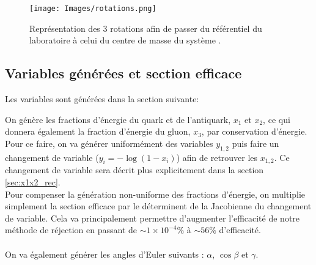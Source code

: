 \documentclass[a4paper]{article} %
\numberwithin{equation}{section} %
\theoremstyle{definition}
\theoremstyle{remark}
\theoremstyle{plain}%
\theoremstyle{style_exemple}
\begin{document}
\begin{figure}[H]
    \centering
    \texttt{[image: Images/rotations.png]}
    \begin{minipage}{12cm}
        \caption{Représentation des 3 rotations afin de passer du référentiel du laboratoire à celui du centre de masse du système \cite{Sol_ee-qqg}.}
        \label{fig:rotations}
    \end{minipage}
\end{figure}

\newpage
\subsection{Variables générées et section efficace}
Les variables sont générées dans la section suivante:


On génère les fractions d'énergie du quark et de l'antiquark, $x_1$ et $x_2$, ce qui donnera également la fraction d'énergie du gluon, $x_3$, par conservation d'énergie. Pour ce faire, on va générer uniformément des variables $y_{1,2}$ puis faire un changement de variable ($y_i=-\log(1-x_i)$) afin de retrouver les $x_{1,2}$. Ce changement de variable sera décrit plus explicitement dans la section \ref{sec:x1x2_rec}.\\
Pour compenser la génération non-uniforme des fractions d'énergie, on multiplie simplement la section efficace par le déterminent de la Jacobienne du changement de variable. Cela va principalement permettre d'augmenter l'efficacité de notre méthode de réjection en passant de $\sim1\times10^{-4}\%$ à $\sim 56\%$ d'efficacité.\\
\\
On va également générer les angles d'Euler suivants : $\alpha$, $\cos \beta$ et $\gamma$. 
\end{document}
